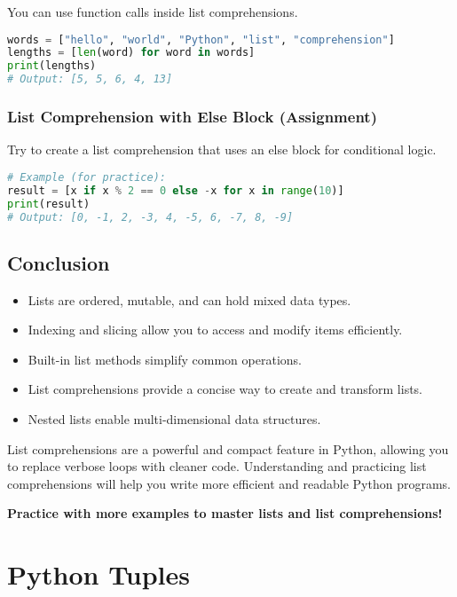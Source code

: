 You can use function calls inside list comprehensions.

\begin{lstlisting}[language=Python]
words = ["hello", "world", "Python", "list", "comprehension"]
lengths = [len(word) for word in words]
print(lengths)
# Output: [5, 5, 6, 4, 13]
\end{lstlisting}

\subsection{List Comprehension with Else Block (Assignment)}

Try to create a list comprehension that uses an else block for conditional logic.

\begin{lstlisting}[language=Python]
# Example (for practice):
result = [x if x % 2 == 0 else -x for x in range(10)]
print(result)
# Output: [0, -1, 2, -3, 4, -5, 6, -7, 8, -9]
\end{lstlisting}

\section{Conclusion}

\begin{itemize}
    \item Lists are ordered, mutable, and can hold mixed data types.
    \item Indexing and slicing allow you to access and modify items efficiently.
    \item Built-in list methods simplify common operations.
    \item List comprehensions provide a concise way to create and transform lists.
    \item Nested lists enable multi-dimensional data structures.
\end{itemize}

List comprehensions are a powerful and compact feature in Python, allowing you to replace verbose loops with cleaner code.  
Understanding and practicing list comprehensions will help you write more efficient and readable Python programs.

\textbf{Practice with more examples to master lists and list comprehensions!}

\chapter{Python Tuples}

